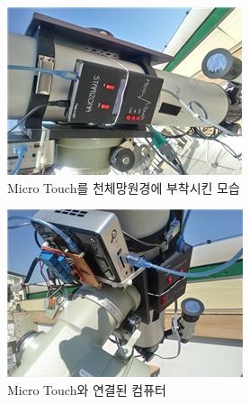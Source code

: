 \documentclass{abstract_hutech}
\begin{document}
\begin{figure}[h]
	\centering
	\includegraphics[width=1\linewidth]{telescope1}
	\caption{Micro Touch를 천체망원경에 부착시킨 모습}
	\label{fig:telescope1}
\end{figure}

\begin{figure}[h]
	\centering
	\includegraphics[width=1\linewidth]{telescope2}
	\caption{Micro Touch와 연결된 컴퓨터}
	\label{fig:telescope2}
\end{figure}
\end{document}
